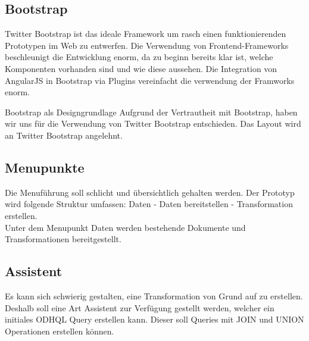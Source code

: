 \subsection{Bootstrap}
Twitter Bootstrap ist das ideale Framework um rasch einen funktionierenden Prototypen im Web zu entwerfen. Die Verwendung von Frontend-Frameworks beschleunigt die Entwicklung enorm, da zu beginn bereits klar ist, welche Komponenten vorhanden sind und wie diese aussehen. Die Integration von AngularJS in Bootstrap via Plugins vereinfacht die verwendung der Framworks enorm.
\begin{decision}[label=dec:frontend:bootstrap]{Bootstrap als Designgrundlage}
Aufgrund der Vertrautheit mit Bootstrap, haben wir uns für die Verwendung von Twitter Bootstrap entschieden. Das Layout wird an Twitter Bootstrap angelehnt.
\end{decision}


\subsection{Menupunkte}
Die Menuführung soll schlicht und übersichtlich gehalten werden. Der Prototyp wird folgende Struktur umfassen: Daten - Daten bereitstellen - Transformation erstellen. \\
Unter dem Menupunkt Daten werden bestehende Dokumente und Transformationen bereitgestellt.\\

\subsection{Assistent}
Es kann sich schwierig gestalten, eine Transformation von Grund auf zu erstellen. Deshalb soll eine Art Assistent zur Verfügung gestellt werden, welcher ein initiales ODHQL Query erstellen kann. Dieser soll Queries mit JOIN und UNION Operationen erstellen können.

